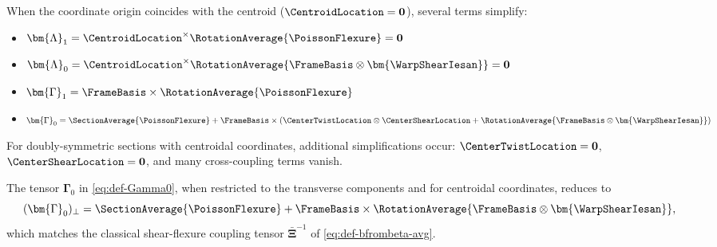 \begin{remark}
When the coordinate origin coincides with the centroid ($\CentroidLocation = \mathbf{0}$), 
several terms simplify:
\begin{itemize}
\item $\bm{\Lambda}_1 = \CentroidLocation^\times \RotationAverage{\PoissonFlexure} = \mathbf{0}$
\item $\bm{\Lambda}_0 = \CentroidLocation^\times \RotationAverage{\FrameBasis\otimes\bm{\WarpShearIesan}} = \mathbf{0}$
\item $\bm{\Gamma}_1 = \FrameBasis \times \RotationAverage{\PoissonFlexure}$
\item $\bm{\Gamma}_0 = \SectionAverage{\PoissonFlexure} + \FrameBasis \times (\CenterTwistLocation \otimes \CenterShearLocation + \RotationAverage{\FrameBasis\otimes\bm{\WarpShearIesan}})$
\end{itemize}
For doubly-symmetric sections with centroidal coordinates, additional 
simplifications occur: $\CenterTwistLocation = \mathbf{0}$, $\CenterShearLocation = \mathbf{0}$, 
and many cross-coupling terms vanish.
\end{remark}

\begin{remark}
The tensor $\bm{\Gamma}_0$ in \eqref{eq:def-Gamma0}, when restricted to the 
transverse components and for centroidal coordinates, reduces to
\begin{equation}
(\bm{\Gamma}_0)_\perp = \SectionAverage{\PoissonFlexure} 
+ \FrameBasis \times \RotationAverage{\FrameBasis \otimes \bm{\WarpShearIesan}},
\end{equation}
which matches the classical shear-flexure coupling tensor 
$\bar{\bm{\Xi}}^{-1}$ of \eqref{eq:def-bfrombeta-avg}.
\end{remark}
